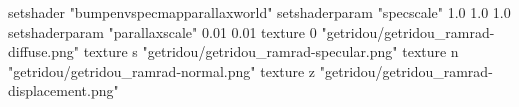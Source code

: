 setshader "bumpenvspecmapparallaxworld"
setshaderparam "specscale" 1.0 1.0 1.0
setshaderparam "parallaxscale" 0.01 0.01
texture 0 "getridou/getridou_ramrad-diffuse.png"
texture s "getridou/getridou_ramrad-specular.png"
texture n "getridou/getridou_ramrad-normal.png"
texture z "getridou/getridou_ramrad-displacement.png"
